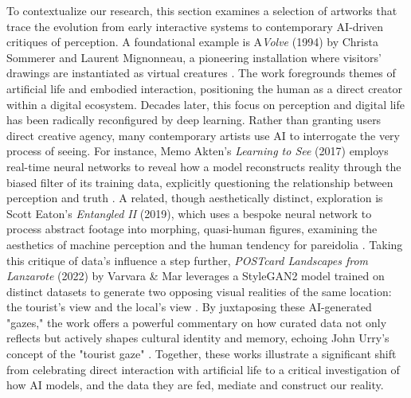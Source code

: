 \documentclass[sigconf,nonacm]{acmart}
\begin{document}
To contextualize our research, this section examines a selection of artworks that trace the evolution from early interactive systems to contemporary AI-driven critiques of perception. A foundational example is A\textendash \textit{Volve} (1994) by Christa Sommerer and Laurent Mignonneau, a pioneering installation where visitors' drawings are instantiated as virtual creatures \cite{AVolve}. The work foregrounds themes of artificial life and embodied interaction, positioning the human as a direct creator within a digital ecosystem. Decades later, this focus on perception and digital life has been radically reconfigured by deep learning. Rather than granting users direct creative agency, many contemporary artists use AI to interrogate the very process of seeing. For instance, Memo Akten's \textit{Learning to See} (2017) employs real-time neural networks to reveal how a model reconstructs reality through the biased filter of its training data, explicitly questioning the relationship between perception and truth \cite{LearningToSeeWeb,LearningToSeePaper}. A related, though aesthetically distinct, exploration is Scott Eaton's \textit{Entangled II} (2019), which uses a bespoke neural network to process abstract footage into morphing, quasi-human figures, examining the aesthetics of machine perception and the human tendency for pareidolia \cite{EntangledII}. Taking this critique of data's influence a step further, \textit{POSTcard Landscapes from Lanzarote} (2022) by Varvara \& Mar leverages a StyleGAN2 model trained on distinct datasets to generate two opposing visual realities of the same location: the tourist's view and the local's view \cite{Guljajeva2022}. By juxtaposing these AI-generated "gazes," the work offers a powerful commentary on how curated data not only reflects but actively shapes cultural identity and memory, echoing John Urry's concept of the "tourist gaze" \cite{Urry2002}. Together, these works illustrate a significant shift from celebrating direct interaction with artificial life to a critical investigation of how AI models, and the data they are fed, mediate and construct our reality.
\end{document}
